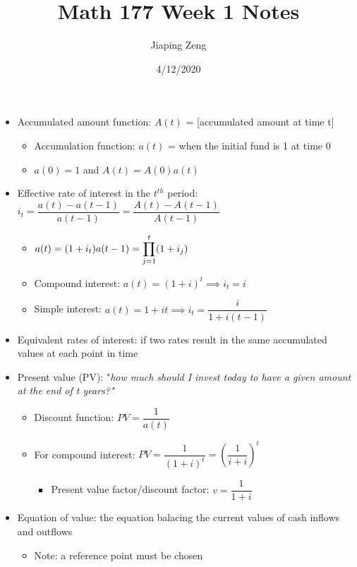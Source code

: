 \documentclass{article}
\title{Math 177 Week 1 Notes}
\author{Jiaping Zeng}
\date{4/12/2020}
\begin{document}
\maketitle

\begin{itemize}
    \item Accumulated amount function: $A(t)$ = [accumulated amount at time t]
          \begin{itemize}
              \item Accumulation function: $a(t)$ = when the initial fund is 1 at time 0
              \item $a(0)=1$ and $A(t)=A(0)a(t)$
          \end{itemize}
    \item Effective rate of interest in the $t^{th}$ period: $i_t=\dfrac{a(t)-a(t-1)}{a(t-1)}=\dfrac{A(t)-A(t-1)}{A(t-1)}$
          \begin{itemize}
              \item $a(t)=(1+i_t)a(t-1)=\mathlarger{\prod_{j=1}^{t}(1+i_j)}$
              \item Compound interest: $a(t)=(1+i)^t \implies i_t=i$
              \item Simple interest: $a(t)=1+it \implies i_t=\dfrac{i}{1+i(t-1)}$
          \end{itemize}
    \item Equivalent rates of interest: if two rates result in the same accumulated values at each point in time
    \item Present value (PV): "\textit{how much should I invest today to have a given amount at the end of t years?"}
          \begin{itemize}
              \item Discount function: $PV=\dfrac{1}{a(t)}$
              \item For compound interest: $PV=\dfrac{1}{(1+i)^t}=\left(\dfrac{1}{i+i}\right)^t$
                    \begin{itemize}
                        \item Present value factor/discount factor: $v=\dfrac{1}{1+i}$
                    \end{itemize}
          \end{itemize}
    \item Equation of value: the equation balacing the current values of cash inflows and outflows
          \begin{itemize}
              \item Note: a reference point must be chosen

\end{itemize}
\end{itemize}
\end{document}
